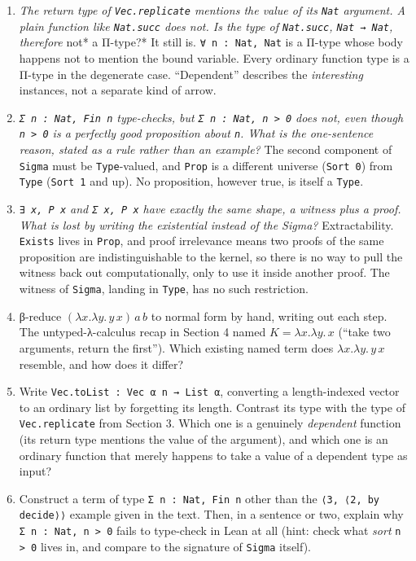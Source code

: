 \begin{enumerate}
\def\labelenumi{\arabic{enumi}.}
\item
  \emph{The return type of \texttt{Vec.replicate} mentions the value of its \texttt{Nat} argument. A plain function like \texttt{Nat.succ} does not. Is the type of \texttt{Nat.succ}, \texttt{Nat → Nat}, therefore }not* a Π-type?* It still is. \texttt{∀ n : Nat, Nat} is a Π-type whose body happens not to mention the bound variable. Every ordinary function type is a Π-type in the degenerate case. ``Dependent'' describes the \emph{interesting} instances, not a separate kind of arrow.
\item
  \emph{\texttt{Σ n : Nat, Fin n} type-checks, but \texttt{Σ n : Nat, n > 0} does not, even though \texttt{n > 0} is a perfectly good proposition about \texttt{n}. What is the one-sentence reason, stated as a rule rather than an example?} The second component of \texttt{Sigma} must be \texttt{Type}-valued, and \texttt{Prop} is a different universe (\texttt{Sort 0}) from \texttt{Type} (\texttt{Sort 1} and up). No proposition, however true, is itself a \texttt{Type}.
\item
  \emph{\texttt{∃ x, P x} and \texttt{Σ x, P x} have exactly the same shape, a witness plus a proof. What is lost by writing the existential instead of the Sigma?} Extractability. \texttt{Exists} lives in \texttt{Prop}, and proof irrelevance means two proofs of the same proposition are indistinguishable to the kernel, so there is no way to pull the witness back out computationally, only to use it inside another proof. The witness of \texttt{Sigma}, landing in \texttt{Type}, has no such restriction.
\item
  β-reduce \((\lambda x.\lambda y.\, y\, x)\, a\, b\) to normal form by hand, writing out each step. The untyped-λ-calculus recap in Section 4 named \(K = \lambda x.\lambda y.\, x\) (``take two arguments, return the first''). Which existing named term does \(\lambda x.\lambda y.\, y\, x\) resemble, and how does it differ?
\item
  Write \texttt{Vec.toList : Vec α n → List α}, converting a length-indexed vector to an ordinary list by forgetting its length. Contrast its type with the type of \texttt{Vec.replicate} from Section 3. Which one is a genuinely \emph{dependent} function (its return type mentions the value of the argument), and which one is an ordinary function that merely happens to take a value of a dependent type as input?
\item
  Construct a term of type \texttt{Σ n : Nat, Fin n} other than the \texttt{⟨3, ⟨2, by decide⟩⟩} example given in the text. Then, in a sentence or two, explain why \texttt{Σ n : Nat, n > 0} fails to type-check in Lean at all (hint: check what \emph{sort} \texttt{n > 0} lives in, and compare to the signature of \texttt{Sigma} itself).

\end{enumerate}
